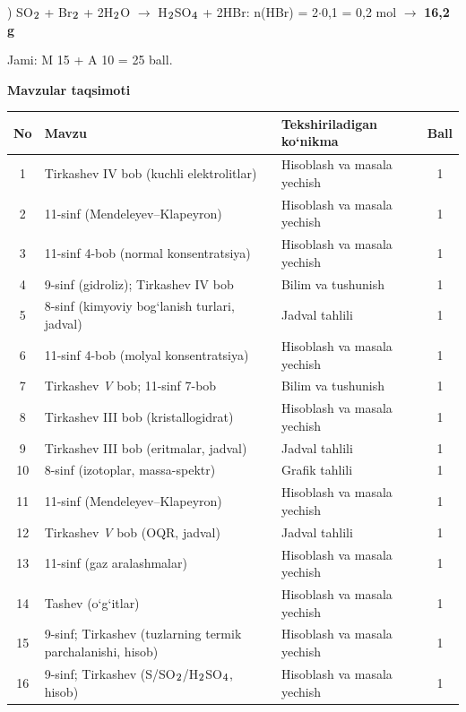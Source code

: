 \documentclass[11pt,a4paper]{article}
\renewcommand{\textsubscript}[1]{\ensuremath{_{\text{\fontsize{8}{8}\selectfont #1}}}}
\begin{document}
) SO\textsubscript{2} + Br\textsubscript{2} + 2H\textsubscript{2}O $\to$ H\textsubscript{2}SO\textsubscript{4} + 2HBr: n(HBr) = 2$\cdot$0,1 = 0,2 mol $\to$ \textbf{16,2 g}\par
\noindent Jami: M 15 + A 10 = 25 ball.\par
\par\bigskip\noindent\textbf{Mavzular taqsimoti}\par\smallskip
{\small\noindent\begin{longtable}{|c|p{7.2cm}|p{5.4cm}|c|}\hline \textbf{No} & \textbf{Mavzu} & \textbf{Tekshiriladigan ko`nikma} & \textbf{Ball}\\\hline
1 & Tirkashev IV bob (kuchli elektrolitlar) & Hisoblash va masala yechish & 1\\\hline
2 & 11-sinf (Mendeleyev--Klapeyron) & Hisoblash va masala yechish & 1\\\hline
3 & 11-sinf 4-bob (normal konsentratsiya) & Hisoblash va masala yechish & 1\\\hline
4 & 9-sinf (gidroliz); Tirkashev IV bob & Bilim va tushunish & 1\\\hline
5 & 8-sinf (kimyoviy bog`lanish turlari, jadval) & Jadval tahlili & 1\\\hline
6 & 11-sinf 4-bob (molyal konsentratsiya) & Hisoblash va masala yechish & 1\\\hline
7 & Tirkashev \textit{V} bob; 11-sinf 7-bob & Bilim va tushunish & 1\\\hline
8 & Tirkashev III bob (kristallogidrat) & Hisoblash va masala yechish & 1\\\hline
9 & Tirkashev III bob (eritmalar, jadval) & Jadval tahlili & 1\\\hline
10 & 8-sinf (izotoplar, massa-spektr) & Grafik tahlili & 1\\\hline
11 & 11-sinf (Mendeleyev--Klapeyron) & Hisoblash va masala yechish & 1\\\hline
12 & Tirkashev \textit{V} bob (OQR, jadval) & Jadval tahlili & 1\\\hline
13 & 11-sinf (gaz aralashmalar) & Hisoblash va masala yechish & 1\\\hline
14 & Tashev (o`g`itlar) & Hisoblash va masala yechish & 1\\\hline
15 & 9-sinf; Tirkashev (tuzlarning termik parchalanishi, hisob) & Hisoblash va masala yechish & 1\\\hline
16 & 9-sinf; Tirkashev (S/SO\textsubscript{2}/H\textsubscript{2}SO\textsubscript{4}, hisob) & Hisoblash va masala yechish & 1\\\hline

\end{longtable}}
\end{document}
